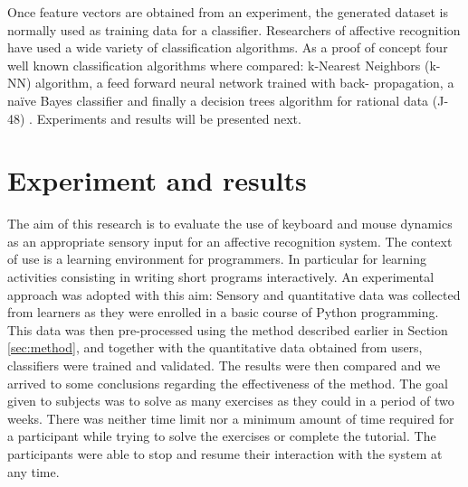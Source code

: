 \documentclass[a4paper,twoside]{article}
\begin{document}
Once feature vectors are obtained from an experiment, the generated dataset is
normally used as training data for a classifier. Researchers of affective
recognition have used a wide variety of classification algorithms. As a proof of
concept four well known classification algorithms where compared: k-Nearest
Neighbors (k-NN) algorithm, a feed forward neural network trained with back-
propagation, a na\"ive Bayes classifier and finally a decision trees algorithm for
rational data (J-48) \cite{tan2006introduction}. Experiments and results will be presented next. 

\section{Experiment and results}
\label{sec:exp}
The aim of this research is to evaluate the use of keyboard
and mouse dynamics as an appropriate sensory input for an affective recognition
system. The context of use is a learning environment for programmers. In
particular for learning activities consisting in writing short programs
interactively. An experimental approach was adopted with this aim: Sensory and
quantitative data was collected from learners as they were enrolled in a basic
course of Python programming. This data was then pre-processed using the method
described earlier in Section \ref{sec:method}, and together with the quantitative data obtained from users,
classifiers were trained and validated. The results were then compared
and we arrived to some conclusions regarding the effectiveness of the method. The goal given to
subjects was to solve as many exercises as they could in a period of two weeks.
There was neither time limit nor a minimum amount of time required for a
participant while trying to solve the exercises or complete the tutorial. The
participants were able to stop and resume their interaction with the system at
any time.
%
\end{document}
